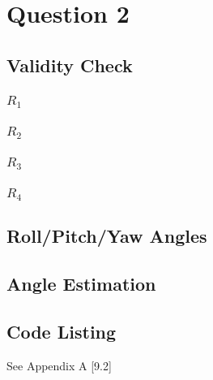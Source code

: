 \section{Question 2}
	


	
	\subsection{Validity Check}
		\subsubsection{$R_{1}$}
	
			
		\pagebreak
		\subsubsection{$R_{2}$}
			
		\subsubsection{$R_{3}$}
		
		\subsubsection{$R_{4}$}
			
						
	\newpage
	\subsection{Roll/Pitch/Yaw Angles}

	\subsection{Angle Estimation}
	
	\subsection*{Code Listing}
	See Appendix A [9.2]